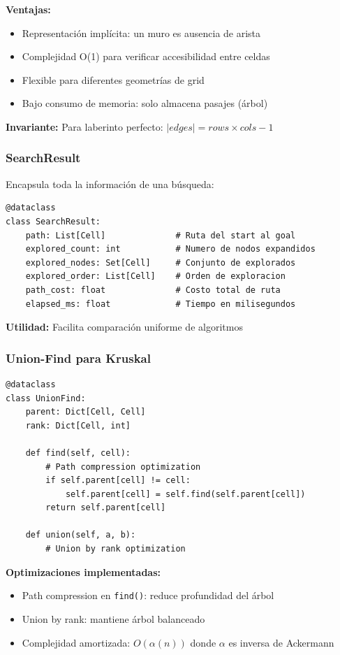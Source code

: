 \documentclass[12pt,a4paper]{article}
\begin{document}
\textbf{Ventajas:}
\begin{itemize}
    \item Representación implícita: un muro es ausencia de arista
    \item Complejidad O(1) para verificar accesibilidad entre celdas
    \item Flexible para diferentes geometrías de grid
    \item Bajo consumo de memoria: solo almacena pasajes (árbol)
\end{itemize}

\textbf{Invariante:} Para laberinto perfecto: $|edges| = rows \times cols - 1$

\subsubsection{SearchResult}

Encapsula toda la información de una búsqueda:

\begin{lstlisting}
@dataclass
class SearchResult:
    path: List[Cell]              # Ruta del start al goal
    explored_count: int           # Numero de nodos expandidos
    explored_nodes: Set[Cell]     # Conjunto de explorados
    explored_order: List[Cell]    # Orden de exploracion
    path_cost: float              # Costo total de ruta
    elapsed_ms: float             # Tiempo en milisegundos
\end{lstlisting}

\textbf{Utilidad:} Facilita comparación uniforme de algoritmos

\subsubsection{Union-Find para Kruskal}

\begin{lstlisting}
@dataclass
class UnionFind:
    parent: Dict[Cell, Cell]
    rank: Dict[Cell, int]
    
    def find(self, cell):
        # Path compression optimization
        if self.parent[cell] != cell:
            self.parent[cell] = self.find(self.parent[cell])
        return self.parent[cell]
    
    def union(self, a, b):
        # Union by rank optimization
\end{lstlisting}

\textbf{Optimizaciones implementadas:}
\begin{itemize}
    \item Path compression en \texttt{find()}: reduce profundidad del árbol
    \item Union by rank: mantiene árbol balanceado
    \item Complejidad amortizada: $O(\alpha(n))$ donde $\alpha$ es inversa de Ackermann
\end{itemize}
\end{document}
